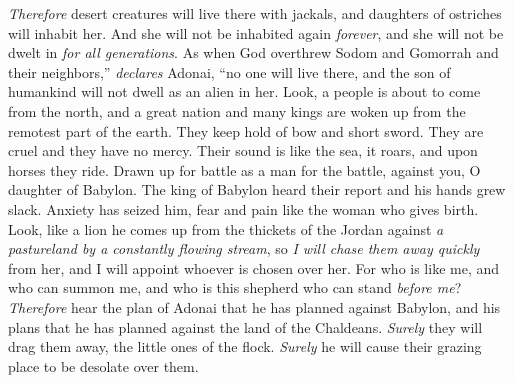 \begin{biblechapter}
\verse \textit{Therefore} desert creatures will live there with jackals, 
and daughters of ostriches will inhabit her. 
And she will not be inhabited again \textit{forever}, 
and she will not be dwelt in \textit{for all generations}.
\verse As when God overthrew Sodom and Gomorrah 
and their neighbors,” \textit{declares} Adonai, 
“no one will live there, 
and the son of humankind will not dwell as an alien in her.
\verse Look, a people is about to come 
from the north, 
and a great nation and many kings are woken up 
from the remotest part of the earth.
\verse They keep hold of bow and short sword. 
They are cruel and they have no mercy. 
Their sound is like the sea, it roars, 
and upon horses they ride. 
Drawn up for battle as a man for the battle, 
against you, O daughter of Babylon.
\verse The king of Babylon heard their report 
and his hands grew slack. 
Anxiety has seized him, 
fear and pain like the woman who gives birth.
\verse Look, like a lion he comes up from the thickets of the Jordan 
against \textit{a pastureland by a constantly flowing stream}, 
so \textit{I will chase them away quickly} from her, 
and I will appoint whoever is chosen over her. 
For who is like me, and who can summon me, 
and who is this shepherd who can stand \textit{before me}?
\verse \textit{Therefore} hear the plan of Adonai 
that he has planned against Babylon, 
and his plans 
that he has planned against the land of the Chaldeans. 
\textit{Surely} they will drag them away, 
the little ones of the flock. 
\textit{Surely} he will cause their grazing place 
to be desolate over them.
\end{biblechapter}


